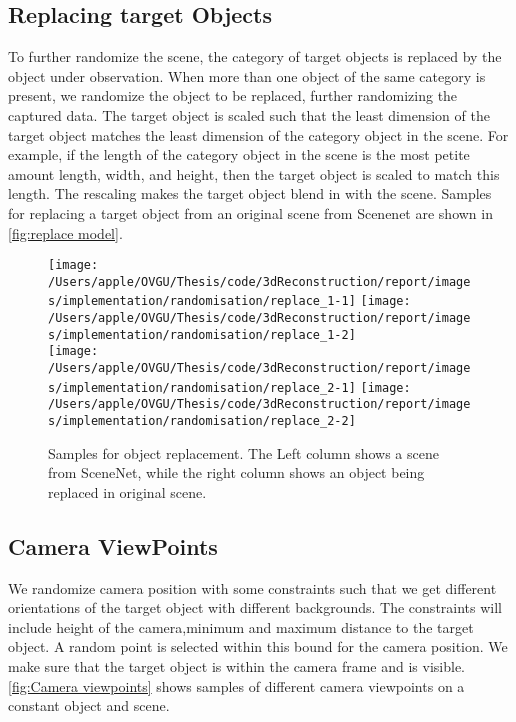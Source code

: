 \subsection{Replacing target Objects}\label{subsec:replacing-target-objects}

To further randomize the scene, the category of target objects is replaced by the object under observation.
When more than one object of the same category is present, we randomize the object to be replaced, further randomizing the captured data.
The target object is scaled such that the least dimension of the target object matches the least dimension of the category object in the scene.
For example, if the length of the category object in the scene is the most petite amount length, width, and height, then the target object is scaled to match this length.
The rescaling makes the target object blend in with the scene.
Samples for replacing a target object from an original scene from Scenenet are shown in \autoref{fig:replace model}.

\begin{figure}
    \centering
    \texttt{[image: /Users/apple/OVGU/Thesis/code/3dReconstruction/report/images/implementation/randomisation/replace\_1-1]}
    \texttt{[image: /Users/apple/OVGU/Thesis/code/3dReconstruction/report/images/implementation/randomisation/replace\_1-2]} \\
    \vspace{0.1cm}
    \texttt{[image: /Users/apple/OVGU/Thesis/code/3dReconstruction/report/images/implementation/randomisation/replace\_2-1]}
    \texttt{[image: /Users/apple/OVGU/Thesis/code/3dReconstruction/report/images/implementation/randomisation/replace\_2-2]}\\
    \caption{Samples for object replacement. The Left column shows a scene from SceneNet, while the right column shows an object being replaced in original scene.}
    \label{fig:replace model}
\end{figure}


\subsection{Camera ViewPoints}\label{subsec:camera-viewpoints}

We randomize camera position with some constraints such that we get different orientations of the target object with different backgrounds.
The constraints will include height of the camera,minimum and maximum distance to the target object.
A random point is selected within this bound for the camera position.
We make sure that the target object is within the camera frame and is visible.
\autoref{fig:Camera viewpoints} shows samples of different camera viewpoints on a constant object and scene.

